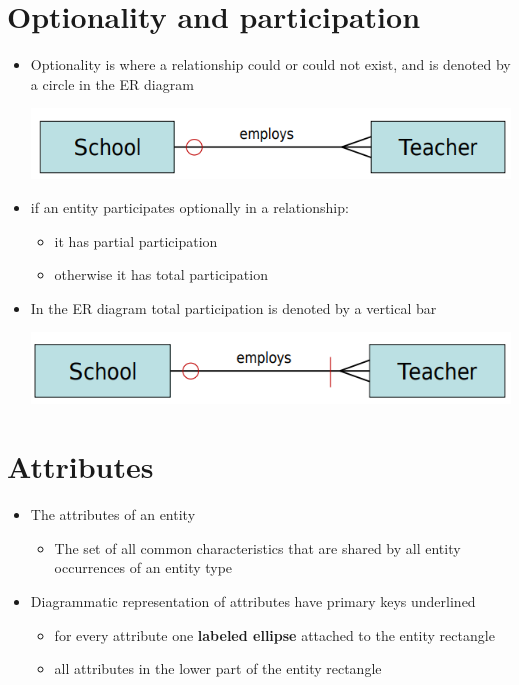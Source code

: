 \documentclass{article}[18pt]
\begin{document}
\section{Optionality and participation}
\begin{itemize}
	\item Optionality is where a relationship could or could not exist, and is denoted by a circle in the ER diagram
\begin{center}
	\includegraphics[scale=0.7]{optionality}
\end{center}
	\item if an entity participates optionally in a relationship:
	\begin{itemize}
		\item it has partial participation
		\item otherwise it has total participation
	\end{itemize}
	\item In the ER diagram total participation is denoted by a vertical bar
	\begin{center}
		\includegraphics[scale=0.7]{participation}
	\end{center}
	
\end{itemize}
\section{Attributes}
\begin{itemize}
	\item The attributes of an entity
	\begin{itemize}
		\item The set of all common characteristics that are shared by all entity occurrences of an entity type
	\end{itemize}
	\item Diagrammatic representation of attributes have primary keys underlined
	\begin{itemize}
		\item for every attribute one \textbf{labeled ellipse} attached to the entity rectangle
		\item all attributes in the lower part of the entity rectangle
	\end{itemize}
\end{itemize}
\end{document}
